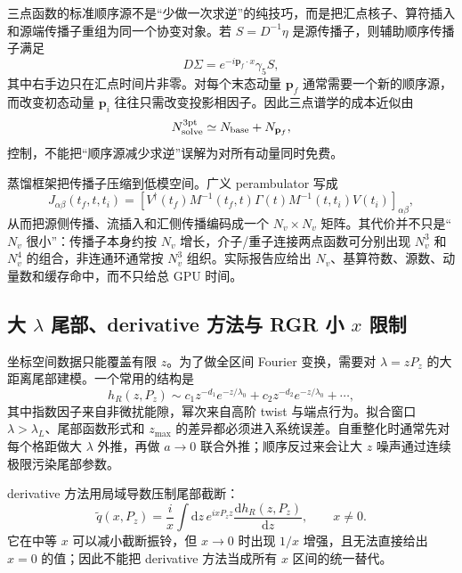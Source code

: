 \documentclass[UTF8,12pt,a4paper,twoside,openany]{ctexbook}
\newcommand{\dd}{\mathrm{d}}
\begin{document}
三点函数的标准顺序源不是“少做一次求逆”的纯技巧，而是把汇点核子、算符插入和源端传播子重组为同一个协变对象。若 \(S=D^{-1}\eta\) 是源传播子，则辅助顺序传播子满足
\begin{equation}
  D\Sigma=e^{-i\mathbf p_f\cdot x}\gamma_5S,
  \label{eq:sequentialdirac}
\end{equation}
其中右手边只在汇点时间片非零。对每个末态动量 \(\mathbf p_f\) 通常需要一个新的顺序源，而改变初态动量 \(\mathbf p_i\) 往往只需改变投影相因子。因此三点谱学的成本近似由
\begin{equation}
  N_{\rm solve}^{3\rm pt}\simeq N_{\rm base}+N_{\mathbf p_f},
  \label{eq:sequentialcost}
\end{equation}
控制，不能把“顺序源减少求逆”误解为对所有动量同时免费。

蒸馏框架把传播子压缩到低模空间。广义 perambulator 写成
\begin{equation}
  J_{\alpha\beta}(t_f,t,t_i)
  =\left[V^\dagger(t_f)M^{-1}(t_f,t)\Gamma(t)
  M^{-1}(t,t_i)V(t_i)\right]_{\alpha\beta},
  \label{eq:generalizedperambulator}
\end{equation}
从而把源侧传播、流插入和汇侧传播编码成一个 \(N_v\times N_v\) 矩阵。其代价并不只是“\(N_v\) 很小”：传播子本身约按 \(N_v\) 增长，介子/重子连接两点函数可分别出现 \(N_v^3\) 和 \(N_v^4\) 的组合，非连通环通常按 \(N_v^3\) 组织。实际报告应给出 \(N_v\)、基算符数、源数、动量数和缓存命中，而不只给总 GPU 时间\cite{Peardon2009,Bali2016}。

\subsection{\texorpdfstring{大 \(\lambda\) 尾部、derivative 方法与 RGR 小 \(x\) 限制}{大 lambda 尾部、derivative 方法与 RGR 小 x 限制}}

坐标空间数据只能覆盖有限 \(z\)。为了做全区间 Fourier 变换，需要对 \(\lambda=zP_z\) 的大距离尾部建模。一个常用的结构是
\begin{equation}
  h_R(z,P_z)
  \sim c_1z^{-d_1}e^{-z/\lambda_0}
  +c_2z^{-d_2}e^{-z/\lambda_0}+\cdots ,
  \label{eq:large-lambda-tail}
\end{equation}
其中指数因子来自非微扰能隙，幂次来自高阶 twist 与端点行为。拟合窗口 \(\lambda>\lambda_L\)、尾部函数形式和 \(z_{\max}\) 的差异都必须进入系统误差。自重整化时通常先对每个格距做大 \(\lambda\) 外推，再做 \(a\to0\) 联合外推；顺序反过来会让大 \(z\) 噪声通过连续极限污染尾部参数。

derivative 方法用局域导数压制尾部截断：
\begin{equation}
  \widetilde q(x,P_z)
  =\frac{i}{x}\int\dd z\,e^{ixP_zz}
  \frac{\dd h_R(z,P_z)}{\dd z},
  \qquad x\neq0.
  \label{eq:derivativemethod}
\end{equation}
它在中等 \(x\) 可以减小截断振铃，但 \(x\to0\) 时出现 \(1/x\) 增强，且无法直接给出 \(x=0\) 的值；因此不能把 derivative 方法当成所有 \(x\) 区间的统一替代。
\end{document}
